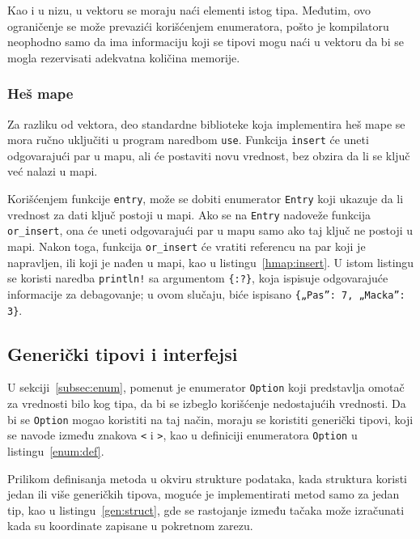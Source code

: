 \documentclass[12pt,oneside]{memoir}
\begin{document}


Kao i u nizu, u vektoru se moraju naći elementi istog tipa. Međutim, ovo
ograničenje se može prevazići korišćenjem enumeratora, pošto je kompilatoru
neophodno samo da ima informaciju koji se tipovi mogu naći u vektoru da bi se
mogla rezervisati adekvatna količina memorije.

\subsubsection{Heš mape}
Za razliku od vektora, deo standardne biblioteke koja implementira heš mape
se mora ručno uključiti u program naredbom \texttt{use}. Funkcija \texttt{insert} će uneti
odgovarajući par u mapu, ali će postaviti novu vrednost, bez obzira da li se ključ već
nalazi u mapi.

Korišćenjem funkcije \texttt{entry}, može se dobiti enumerator \texttt{Entry} koji ukazuje
da li vrednost za dati ključ postoji u mapi. Ako se na \texttt{Entry} nadoveže funkcija
\texttt{or\_insert}, ona će uneti odgovarajući par u mapu samo ako taj ključ ne postoji u
mapi. Nakon toga, funkcija \texttt{or\_insert}
će vratiti referencu na par koji je napravljen, ili koji
je nađen u mapi, kao u listingu~\ref{hmap:insert}. U istom listingu se koristi naredba
\texttt{println!} sa argumentom \texttt{\{:?\}}, koja ispisuje odgovarajuće informacije
za debagovanje; u ovom slučaju, biće ispisano \texttt{\{„Pas”: 7, „Macka”: 3\}}.



\subsection{Generički tipovi i interfejsi}
U sekciji~\ref{subsec:enum}, pomenut je enumerator \texttt{Option} koji predstavlja
omotač za vrednosti bilo kog tipa, da bi se izbeglo korišćenje nedostajućih vrednosti.
Da bi se \texttt{Option} mogao koristiti na taj način, moraju se koristiti generički
tipovi, koji se navode između znakova \texttt{<} i \texttt{>}, kao u
definiciji enumeratora \texttt{Option} u listingu~\ref{enum:def}.

Prilikom definisanja metoda u okviru strukture podataka, kada struktura koristi
jedan ili više generičkih tipova, moguće je implementirati metod samo za jedan
tip, kao u listingu~\ref{gen:struct}, gde se rastojanje između tačaka može
izračunati kada su koordinate zapisane u pokretnom zarezu.
\end{document}

